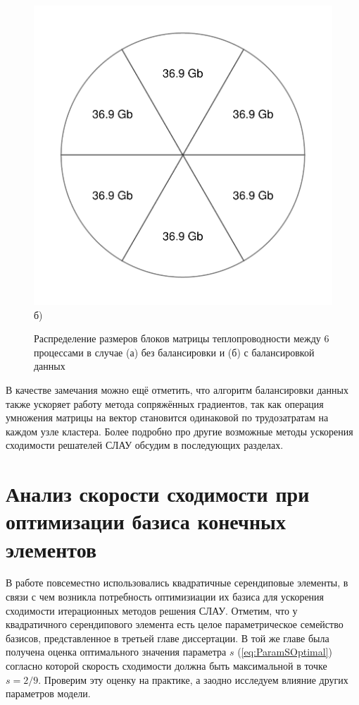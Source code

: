 \begin{figure}[ht]
\begin{minipage}[b][][b]{0.49\linewidth}
        \includegraphics[width=\linewidth]{pics/PieChartBalance.pdf} \\ б)
    \end{minipage}
    \caption{Распределение размеров блоков матрицы теплопроводности между 6 процессами в случае (а) без балансировки и (б) с балансировкой данных}
    \label{fig:MPIBalance}
\end{figure}

В качестве замечания можно ещё отметить, что алгоритм балансировки данных также ускоряет работу метода сопряжённых градиентов, так как операция умножения матрицы на вектор становится одинаковой по трудозатратам на каждом узле кластера. Более подробно про другие возможные методы ускорения сходимости решателей СЛАУ обсудим в последующих разделах.

\section{Анализ скорости сходимости при оптимизации базиса конечных элементов}\label{sec:NumericalMethods/BasisOptimization}

В работе повсеместно использовались квадратичные серендиповые элементы, в связи с чем возникла потребность оптимизиации их базиса для ускорения сходимости итерационных методов решения СЛАУ. Отметим, что у квадратичного серендипового элемента есть целое параметрическое семейство базисов, представленное в третьей главе диссертации. В той же главе была получена оценка оптимального значения параметра $s$ (\ref{eq:ParamSOptimal}) согласно которой скорость сходимости должна быть максимальной в точке $s = 2/9$. Проверим эту оценку на практике, а заодно исследуем влияние других параметров модели.

